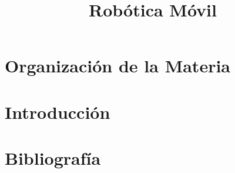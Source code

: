 \documentclass[compress]{beamer}
\title{Robótica Móvil}
\author{}
\institute{Universidad Nacional de Rosario}
\date{}
\begin{document}
\frame{\titlepage}

\section{Organización de la Materia}


\section{Introducción}


\section{Bibliografía}

\end{document}
